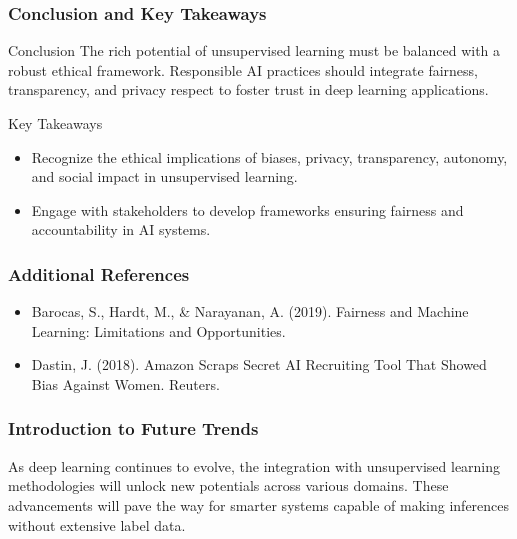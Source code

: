 \documentclass[aspectratio=169]{beamer}
\begin{document}
\begin{frame}[fragile]
    \frametitle{Conclusion and Key Takeaways}
    
    \begin{block}{Conclusion}
        The rich potential of unsupervised learning must be balanced with a robust ethical framework. Responsible AI practices should integrate fairness, transparency, and privacy respect to foster trust in deep learning applications.
    \end{block}

    \begin{block}{Key Takeaways}
        \begin{itemize}
            \item Recognize the ethical implications of biases, privacy, transparency, autonomy, and social impact in unsupervised learning.
            \item Engage with stakeholders to develop frameworks ensuring fairness and accountability in AI systems.
        \end{itemize}
    \end{block}

\end{frame}

\begin{frame}[fragile]
    \frametitle{Additional References}
    
    \begin{itemize}
        \item Barocas, S., Hardt, M., \& Narayanan, A. (2019). Fairness and Machine Learning: Limitations and Opportunities. 
        \item Dastin, J. (2018). Amazon Scraps Secret AI Recruiting Tool That Showed Bias Against Women. Reuters.
    \end{itemize}

\end{frame}

\begin{frame}[fragile]
    \frametitle{Introduction to Future Trends}
    As deep learning continues to evolve, the integration with unsupervised learning methodologies will unlock new potentials across various domains. These advancements will pave the way for smarter systems capable of making inferences without extensive label data.
\end{frame}
\end{document}
